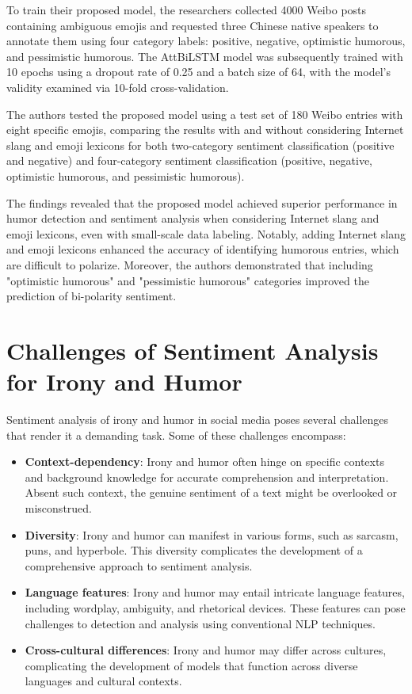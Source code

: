 \documentclass[a4paper]{article}
\begin{document}
To train their proposed model, the researchers collected 4000 Weibo posts containing ambiguous emojis and requested three Chinese native speakers to annotate them using four category labels: positive, negative, optimistic humorous, and pessimistic humorous. The AttBiLSTM model was subsequently trained with 10 epochs using a dropout rate of 0.25 and a batch size of 64, with the model's validity examined via 10-fold cross-validation.

The authors tested the proposed model using a test set of 180 Weibo entries with eight specific emojis, comparing the results with and without considering Internet slang and emoji lexicons for both two-category sentiment classification (positive and negative) and four-category sentiment classification (positive, negative, optimistic humorous, and pessimistic humorous).

The findings revealed that the proposed model achieved superior performance in humor detection and sentiment analysis when considering Internet slang and emoji lexicons, even with small-scale data labeling. Notably, adding Internet slang and emoji lexicons enhanced the accuracy of identifying humorous entries, which are difficult to polarize. Moreover, the authors demonstrated that including "optimistic humorous" and "pessimistic humorous" categories improved the prediction of bi-polarity sentiment.


\section{Challenges of Sentiment Analysis for Irony and Humor}
Sentiment analysis of irony and humor in social media poses several challenges that render it a demanding task. Some of these challenges encompass:

\begin{itemize}
\item \textbf{Context-dependency}: Irony and humor often hinge on specific contexts and background knowledge for accurate comprehension and interpretation. Absent such context, the genuine sentiment of a text might be overlooked or misconstrued.
\item \textbf{Diversity}: Irony and humor can manifest in various forms, such as sarcasm, puns, and hyperbole. This diversity complicates the development of a comprehensive approach to sentiment analysis.
\item \textbf{Language features}: Irony and humor may entail intricate language features, including wordplay, ambiguity, and rhetorical devices. These features can pose challenges to detection and analysis using conventional NLP techniques.
\item \textbf{Cross-cultural differences}: Irony and humor may differ across cultures, complicating the development of models that function across diverse languages and cultural contexts.
\end{itemize}
\end{document}
